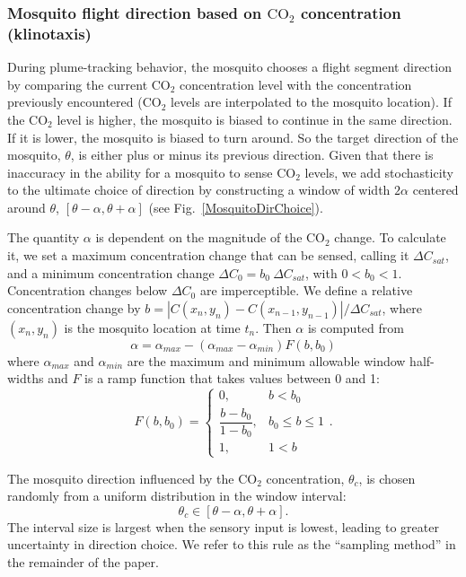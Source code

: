 \documentclass[10pt]{article}
\begin{document}
	

\subsubsection*{Mosquito flight direction based on $\mbox{CO}_2$ concentration (klinotaxis)}
During plume-tracking behavior, the mosquito chooses a flight segment direction by comparing the current $\mbox{CO}_2$ concentration level
with the concentration previously encountered ($\mbox{CO}_2$ levels are interpolated to the mosquito location).  If the $\mbox{CO}_2$ level is higher, the mosquito is biased to continue in the same direction. If it is lower, the mosquito is biased to turn around. So the target direction of the mosquito, $\theta$, is either plus or minus its previous direction.
Given that there is inaccuracy in the ability for a mosquito to sense $\mbox{CO}_2$ levels, 
we add stochasticity to the ultimate choice of direction by constructing a window of width $2\alpha$ centered around $\theta$, $[\theta-\alpha,\theta+\alpha]$ (see Fig.~\ref{MosquitoDirChoice}).  

The quantity $\alpha$ is dependent on the magnitude of the $\mbox{CO}_2$ change. To calculate it, we set a maximum concentration
change that can be sensed, calling it $\Delta C_{sat}$, and a minimum concentration change $\Delta C_0 = b_0\ \Delta C_{sat}$, with $0<b_0<1$.  
Concentration changes below $\Delta C_0$ are imperceptible.  We define a relative concentration 
change by $b = |C(x_n,y_n)-C(x_{n-1},y_{n-1})|/\Delta C_{sat}$,
where $(x_n,y_n)$ is the mosquito location at time $t_n$.
%
Then $\alpha$ is computed from
\begin{equation} \label{eqn:response}
\alpha = \alpha_{max} - (\alpha_{max}-\alpha_{min}) F(b,b_0)
\end{equation}
where $\alpha_{max}$ and $\alpha_{min}$ are the maximum and minimum allowable window half-widths and $F$ is a
ramp function that takes values between 0 and 1:
\begin{equation*}
F(b, b_0) = \left\{ \begin{array}{lr}
   0, & b < b_0 \\
   \dfrac{b-b_0}{1 - b_0}, & b_0 \leq b \leq 1 \\
   1, & 1 < b
   \end{array}\right. .
 \end{equation*}

The mosquito direction influenced by the $\mbox{CO}_2$ concentration, $\theta_c$, is chosen randomly from a uniform distribution in the window interval: 
\begin{equation}
	\theta_c \in [\theta-\alpha,\theta+\alpha].\label{eqn:thetac}
\end{equation}
The interval size is largest when the sensory input is lowest, leading to greater uncertainty in direction choice. 
We refer to this rule as the ``sampling method'' in the remainder of the paper.
\end{document}
